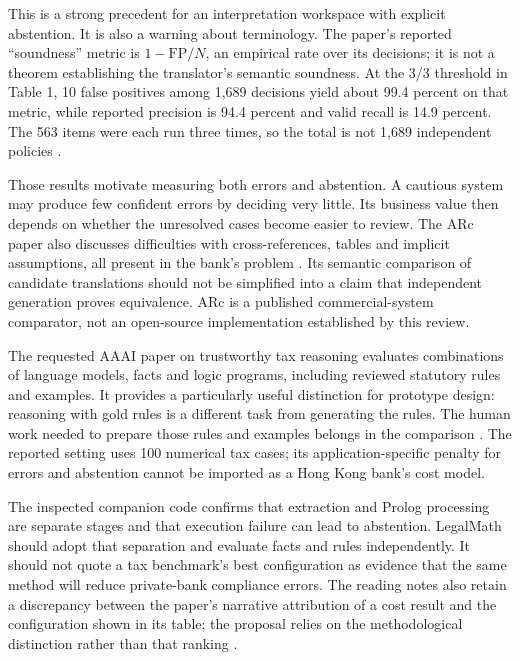 This is a strong precedent for an interpretation workspace with explicit
abstention. It is also a warning about terminology. The paper's reported
``soundness'' metric is $1-\mathrm{FP}/N$, an empirical rate over its decisions;
it is not a theorem establishing the translator's semantic soundness. At the
3/3 threshold in Table 1, 10 false positives among 1,689 decisions yield about
99.4 percent on that metric, while reported precision is 94.4 percent and valid
recall is 14.9 percent. The 563 items were each run three times, so the total is
not 1,689 independent policies \citep[sec.~4, Table~1]{arc2025}.

Those results motivate measuring both errors and abstention. A cautious system
may produce few confident errors by deciding very little. Its business value
then depends on whether the unresolved cases become easier to review. The ARc
paper also discusses difficulties with cross-references, tables and implicit
assumptions, all present in the bank's problem
\citep[sec.~5 and app.~A.1]{arc2025}. Its semantic comparison of candidate
translations should not be simplified into a claim that independent generation
proves equivalence. ARc is a published commercial-system comparator, not an
open-source implementation established by this review.

The requested AAAI paper on trustworthy tax reasoning evaluates combinations of
language models, facts and logic programs, including reviewed statutory rules and
examples. It provides a particularly useful distinction for prototype design:
reasoning with gold rules is a different task from generating the rules. The
human work needed to prepare those rules and examples belongs in the comparison
\citep[Tables~2--3]{jurayj2026,jurayj2025extended}. The reported setting uses
100 numerical tax cases; its application-specific penalty for errors and abstention
cannot be imported as a Hong Kong bank's cost model.

The inspected companion code confirms that extraction and Prolog processing are
separate stages and that execution failure can lead to abstention. LegalMath
should adopt that separation and evaluate facts and rules independently. It
should not quote a tax benchmark's best configuration as evidence that the same
method will reduce private-bank compliance errors. The reading notes also retain
a discrepancy between the paper's narrative attribution of a cost result and
the configuration shown in its table; the proposal relies on the methodological
distinction rather than that ranking \citep{libraryreview}.

